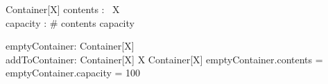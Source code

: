 \documentclass[a4paper,10pt,fleqn]{article}
\begin{document}
\begin{schema}{Container}[X]
contents : \seq~X \\
capacity : \nat
\where
\# contents \leq capacity
\end{schema}

\begin{gendef}[X]
  emptyContainer: Container[X] \\
  addToContainer: Container[X] \cross X \fun Container[X]
\where
  emptyContainer.contents = \langle \rangle \land emptyContainer.capacity = 100
\end{gendef}
\end{document}
